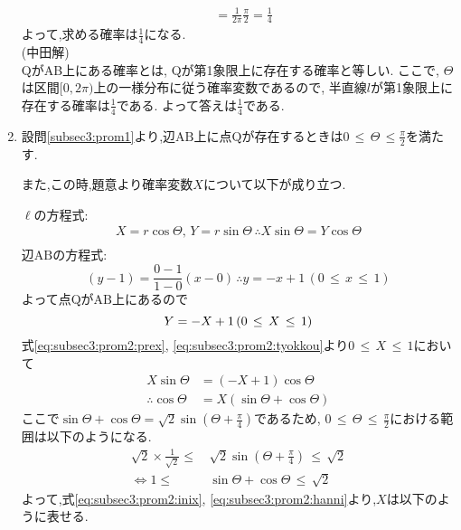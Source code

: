 \documentclass[dvipdfmx,titlepage, 11pt, a4paper]{jsarticle}%
\begin{document}
\begin{enumerate}[(1)]
\begin{align*}
      &= \frac{1}{2\pi}\frac{\pi}{2} = \frac{1}{4}
  \end{align*}
  よって,求める確率は$\frac{1}{4}$になる.\\[1cm]
  (中田解)\\
  QがAB上にある確率とは, Qが第1象限上に存在する確率と等しい. ここで, $\Theta$は区間$[0,2\pi)$上の一様分布に従う確率変数であるので, 半直線$l$が第1象限上に存在する確率は$\displaystyle \frac{1}{4}$である. よって答えは$\displaystyle \frac{1}{4}$である.
\item 設問\eqref{subsec3:prom1}より,辺$\mathrm{AB}$上に点$\mathrm{Q}$が存在するときは$0\, \leq \, \Theta\, \leq \frac{\pi}{2}$を満たす.
  
  また,この時,題意より確率変数$X$について以下が成り立つ.
  
  $\ell$の方程式: 
  \begin{align}
    X = r\cos\Theta, \, Y = r\sin\Theta\, 
    \therefore X\sin\Theta = Y\cos\Theta\label{eq:subsec3:prom2:prex}\\
  \end{align}
  辺$\mathrm{AB}$の方程式:
  \begin{equation*}
    (y - 1) = \frac{0 - 1}{1 - 0}(x - 0)\, \therefore y = -x + 1\, (0\, \leq \, x \, \leq \, 1)
  \end{equation*}
  よって点$\mathrm{Q}$が$\mathrm{AB}$上にあるので
  \begin{equation}
    Y = -X + 1\, (0\, \leq\,  X\, \leq \, 1)\label{eq:subsec3:prom2:tyokkou}\\
  \end{equation}
  式\eqref{eq:subsec3:prom2:prex}, \eqref{eq:subsec3:prom2:tyokkou}より$0\, \leq\, X\, \leq\, 1$において
  \begin{align}
    X\sin\Theta &= (-X + 1)\cos\Theta\nonumber\\
    \therefore \cos\Theta &= X(\sin\Theta + \cos\Theta)\label{eq:subsec3:prom2:inix}
  \end{align}
  ここで$\sin\Theta + \cos\Theta = \sqrt{2}\sin\left(\Theta + \frac{\pi}{4}\right)$であるため,
  $0\, \leq\, \Theta\, \leq \, \frac{\pi}{2}$における範囲は以下のようになる.
  \begin{align}
    \sqrt{2}\times\frac{1}{\sqrt{2}} \leq\, &\sqrt{2}\sin\left(\Theta + \frac{\pi}{4}\right) \, \leq\, \sqrt{2}\nonumber\\
    \Longleftrightarrow 
    1 \leq\, &\sin\Theta + \cos\Theta \, \leq\, \sqrt{2}\label{eq:subsec3:prom2:hanni}
  \end{align}
  よって,式\eqref{eq:subsec3:prom2:inix}, \eqref{eq:subsec3:prom2:hanni}より,$X$は以下のように表せる.

\end{enumerate}
\end{document}
